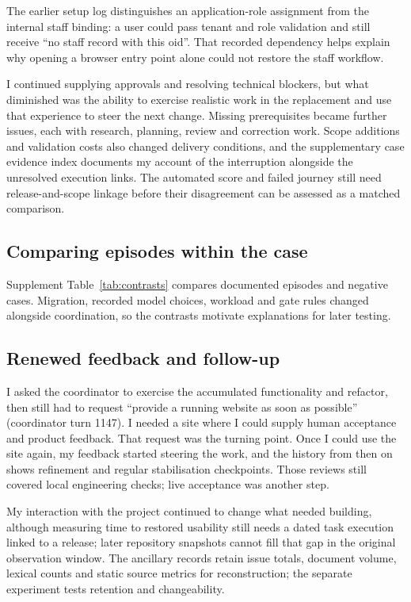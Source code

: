 \documentclass[11pt,a4paper]{article}
\begin{document}
The earlier setup log distinguishes an application-role assignment from
the internal staff binding: a user could pass tenant and role validation
and still receive \textquotedblleft{}no staff record with this oid\textquotedblright{}.
That recorded
dependency helps explain why opening a browser entry point alone could
not restore the staff workflow.

I continued supplying approvals and resolving technical blockers, but what diminished was the ability to exercise realistic work in the
replacement and use that experience to steer the next change. Missing
prerequisites became further issues, each with research, planning, review
and correction work. Scope additions and validation costs also changed
delivery conditions, and the supplementary case evidence index documents
my account of the interruption alongside the unresolved execution links.
The automated score and failed journey still need release-and-scope linkage
before their disagreement can be assessed as a matched comparison.

\subsection{Comparing episodes within the case}\label{sec:contrasts}

Supplement Table~\ref{tab:contrasts} compares documented episodes and negative cases.
Migration, recorded model choices, workload and gate rules changed alongside coordination, so the contrasts motivate explanations for later testing.



\subsection{Renewed feedback and follow-up}\label{sec:currentstatus}

I asked the coordinator to exercise the accumulated functionality and
refactor, then still had to request ``provide a running website as soon
as possible'' (coordinator turn 1147). I needed a site where I could supply human acceptance and product feedback.
That request was the turning point. Once I could use the site again, my feedback started steering the work, and the history from then on shows refinement and regular stabilisation checkpoints. Those reviews still covered local engineering checks; live acceptance was another step.

My interaction with the project continued to change what needed building, although measuring time to restored usability still needs a dated task execution linked to a release; later repository snapshots cannot fill that gap in the original observation window. The ancillary records retain issue
totals, document volume, lexical counts and static source metrics for
reconstruction; the separate experiment tests retention and changeability.
\end{document}
